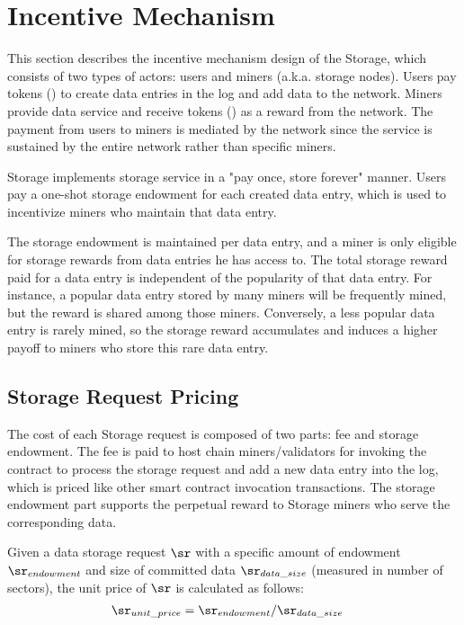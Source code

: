 
\section{Incentive Mechanism}

This section describes the incentive mechanism design of the \projabbrev Storage, which consists of two types of actors: users and miners (a.k.a. storage nodes). Users pay tokens (\token) to create data entries in the log and add data to the network. Miners provide data service and receive tokens (\token) as a reward from the network. The payment from users to miners is mediated by the \project network since the service is sustained by the entire network rather than specific miners.

\projabbrev Storage implements storage service in a "pay once, store forever" manner. Users pay a one-shot storage endowment for each created data entry, which is used to incentivize miners who maintain that data entry.

The storage endowment is maintained per data entry, and a miner is only eligible for storage rewards from data entries he has access to. The total storage reward paid for a data entry is independent of the popularity of that data entry. For instance, a popular data entry stored by many miners will be frequently mined, but the reward is shared among those miners. Conversely, a less popular data entry is rarely mined, so the storage reward accumulates and induces a higher payoff to miners who store this rare data entry.

\subsection{Storage Request Pricing}

The cost of each \projabbrev Storage request is composed of two parts: fee and storage endowment. The fee is paid to host chain miners/validators for invoking the \project contract to process the storage request and add a new data entry into the log, which is priced like other smart contract invocation transactions. The storage endowment part supports the perpetual reward to \projabbrev Storage miners who serve the corresponding data.

Given a data storage request $\sr$ with a specific amount of endowment $\sr_{endowment}$ and size of committed data $\sr_{data\_size}$ (measured in number of \sectorsize sectors), the unit price of $\sr$ is calculated as follows:
\begin{align}
	\sr_{unit\_price} &= \sr_{endowment}/\sr_{data\_size}
\end{align}

